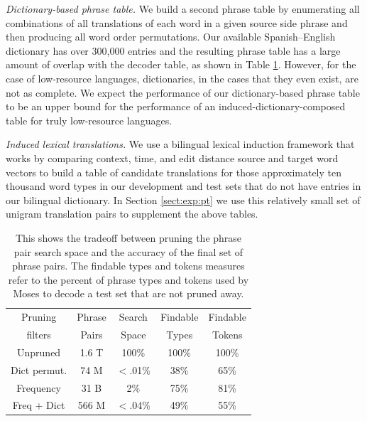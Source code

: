 \documentclass[11pt]{article}
\newcommand{\mnote}[1]{\marginpar{%
  \vskip-\baselineskip
  \raggedright\footnotesize
  \itshape\hrule\smallskip\tiny{#1}\par\smallskip\hrule}}
\newcommand{\mtodo}[1]{\mnote{\textcolor{red}{#1}}}
\newcommand{\paraheader}[1]{\vskip 0.08in \noindent\emph{#1}}
\begin{document}
\paraheader{Dictionary-based phrase table.}\mtodo{Chris had a citation for this method} We build a second phrase table by enumerating all combinations of all translations of each word in a given source side phrase and then producing all word order permutations. Our available \mtodo{citation from this? it's a combination of some of David's dictionaries, I think} Spanish--English dictionary has over 300,000 entries and the resulting phrase table has a large amount of overlap with the decoder table, as shown in Table \ref{table:prune}. However, for the case of low-resource languages, dictionaries, in the cases that they even exist, are not as complete. We expect the performance of our dictionary-based phrase table to be an upper bound for the performance of an induced-dictionary-composed table for truly low-resource languages.

\paraheader{Induced lexical translations.} We use a bilingual lexical induction framework that works by comparing context, time, and edit distance source and target word vectors to build a table of candidate translations for those approximately ten thousand word types in our development and test sets that do not have entries in our bilingual dictionary. In Section \ref{sect:exp:pt} we use this relatively small set of unigram translation pairs to supplement the above tables.


\begin{table}
\small
\begin{center}
\begin{tabular}{|c|c|c|c|c|}
\hline
Pruning 	& Phrase	& Search & 	Findable 	& Findable \\
filters	& Pairs	&  Space & Types 	&  Tokens \\
\hline
Unpruned & 1.6 T & 100\% & 100\% & 100\% \\
Dict permut. & 74 M & $<$.01\% & 38\% & 65\% \\
Frequency &  31 B & 2\% & 75\% & 81\% \\
Freq + Dict & 566 M & $<$.04\% & 49\% & 55\% \\
\hline
\end{tabular}
\caption{This shows the tradeoff between pruning the phrase pair search space and the accuracy of the final set of phrase pairs. The findable types and tokens measures refer to the percent of phrase types and tokens used by Moses to decode a test set that are not pruned away. }\label{table:prune}
\end{center}
\end{table}
\end{document}
